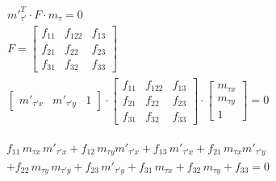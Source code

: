 \begin{gather*}	
	{m'}_{\tau'}^T \cdot F \cdot m_\tau =0\\
	F=\begin{bmatrix}
		f_{11}&f_{122}&f_{13}\\
		f_{21}&f_{22}&f_{23}\\
		f_{31}&f_{32}&f_{33}
	\end{bmatrix}\\
	\begin{bmatrix}
		m'_{\tau' x}&m'_{\tau' y}&1
	\end{bmatrix} 
	\cdot
	\begin{bmatrix}
		f_{11}&f_{122}&f_{13}\\
		f_{21}&f_{22}&f_{23}\\
		f_{31}&f_{32}&f_{33}
	\end{bmatrix}
	\cdot
	\begin{bmatrix}
		m_{\tau x}\\m_{\tau y}\\1
	\end{bmatrix} =0
\end{gather*}

\begin{gather}
\begin{split}
	f_{11}\,m_{\tau x}\,m'_{\tau' x}+f_{12}\,m_{\tau y}m'_{\tau' x}+f_{13}\,m'_{\tau' x}+f_{21}\,m_{\tau x}m'_{\tau' y}\\
	+f_{22}\,m_{\tau y}\,m_{\tau'y}+f_{23}\,m'_{\tau'y}+f_{31}\,m_{\tau x}+f_{32}\,m_{\tau y}+f_{33} =0
\end{split} \label{eq:F}
\end{gather}

